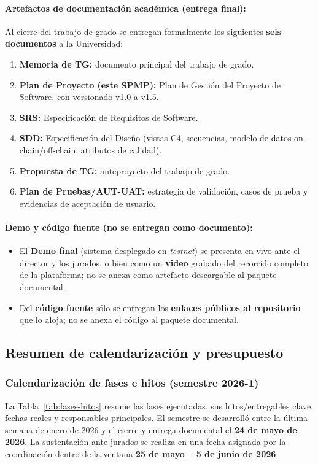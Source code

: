 \documentclass[12pt,oneside]{report}
\begin{document}
      \paragraph{Artefactos de documentación académica (entrega final):}
      Al cierre del trabajo de grado se entregan formalmente los siguientes \textbf{seis documentos} a la Universidad:
      \begin{enumerate}
        \item \textbf{Memoria de TG:} documento principal del trabajo de grado.
        \item \textbf{Plan de Proyecto (este SPMP):} Plan de Gestión del Proyecto de Software, con versionado v1.0 a v1.5.
        \item \textbf{SRS:} Especificación de Requisitos de Software.
        \item \textbf{SDD:} Especificación del Diseño (vistas C4, secuencias, modelo de datos on-chain/off-chain, atributos de calidad).
        \item \textbf{Propuesta de TG:} anteproyecto del trabajo de grado.
        \item \textbf{Plan de Pruebas/AUT-UAT:} estrategia de validación, casos de prueba y evidencias de aceptación de usuario.
      \end{enumerate}

      \paragraph{Demo y código fuente (no se entregan como documento):}
      \begin{itemize}
        \item El \textbf{Demo final} (sistema desplegado en \textit{testnet}) se presenta en vivo ante el director y los jurados, o bien como un \textbf{video} grabado del recorrido completo de la plataforma; no se anexa como artefacto descargable al paquete documental.
        \item Del \textbf{código fuente} sólo se entregan los \textbf{enlaces públicos al repositorio} que lo aloja; no se anexa el código al paquete documental.
      \end{itemize}

    \subsection{Resumen de calendarización y presupuesto}
    \label{subsec:resumen-calendario-presupuesto}

      \subsubsection{Calendarización de fases e hitos (semestre 2026-1)}
      La Tabla~\ref{tab:fases-hitos} resume las fases ejecutadas, sus hitos/entregables clave, fechas reales y responsables principales. El semestre se desarrolló entre la última semana de enero de 2026 y el cierre y entrega documental el \textbf{24 de mayo de 2026}. La sustentación ante jurados se realiza en una fecha asignada por la coordinación dentro de la ventana \textbf{25 de mayo -- 5 de junio de 2026}.
\end{document}
